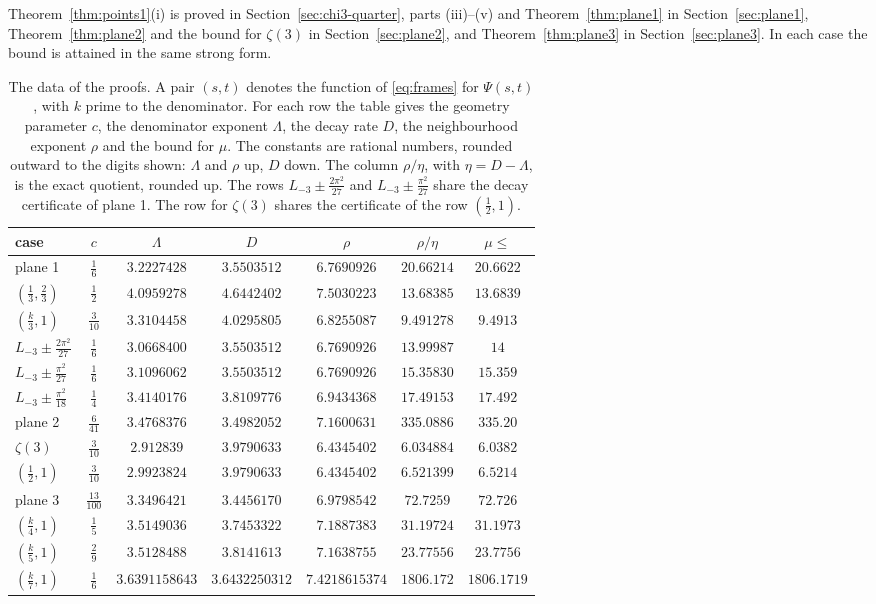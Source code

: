 \documentclass[11pt]{amsart}
\theoremstyle{definition}
\theoremstyle{remark}
\numberwithin{equation}{section}
\newcommand{\Lt}{L_{-3}}             %
\newcommand{\MuLamU}{31.1973}
\newcommand{\MuThirdsU}{9.4913}
\newcommand{\MuFifthsU}{23.7756}
\newcommand{\MuSeventhsU}{1806.1719}
\newcommand{\MuChi}{13.6839}
\newcommand{\MuHalvesU}{6.5214}
\newcommand{\MuPlaneA}{20.6622}
\newcommand{\MuPlaneB}{335.20}
\newcommand{\MuPlaneC}{72.726}
\newcommand{\MuZetaThree}{6.0382}
\newcommand{\MuDipA}{14}
\newcommand{\MuDipB}{15.359}
\newcommand{\MuDipC}{17.492}
\newcommand{\LamFour}{3.5149036}  \newcommand{\DFour}{3.7453322}  \newcommand{\gFour}{7.1887383}  \newcommand{\ExpFour}{31.19724}
\newcommand{\LamThree}{3.3104458} \newcommand{\DThree}{4.0295805} \newcommand{\gThree}{6.8255087} \newcommand{\ExpThree}{9.491278}
\newcommand{\LamFive}{3.5128488}  \newcommand{\DFive}{3.8141613}  \newcommand{\gFive}{7.1638755}  \newcommand{\ExpFive}{23.77556}
\newcommand{\LamSeven}{3.6391158643} \newcommand{\DSeven}{3.6432250312} \newcommand{\gSeven}{7.4218615374} \newcommand{\ExpSeven}{1806.172}
\newcommand{\LamHalf}{2.9923824}  \newcommand{\DHalf}{3.9790633}  \newcommand{\gHalf}{6.4345402}  \newcommand{\ExpHalf}{6.521399}
\newcommand{\LamChi}{4.0959278}   \newcommand{\DChi}{4.6442402}   \newcommand{\gChi}{7.5030223}  \newcommand{\ExpChi}{13.68385}
\newcommand{\LamPl}{3.2227428}    \newcommand{\DPl}{3.5503512}    \newcommand{\gPl}{6.7690926}   \newcommand{\ExpPl}{20.66214}
\newcommand{\LamDA}{3.0668400}    \newcommand{\ExpDA}{13.99987}
\newcommand{\LamDB}{3.1096062}    \newcommand{\ExpDB}{15.35830}
\newcommand{\LamDC}{3.4140176}    \newcommand{\DDC}{3.8109776}    \newcommand{\gDC}{6.9434368}   \newcommand{\ExpDC}{17.49153}
\newcommand{\LamPlB}{3.4768376}   \newcommand{\DPlB}{3.4982052}   \newcommand{\gPlB}{7.1600631}  \newcommand{\ExpPlB}{335.0886}
\newcommand{\LamPlC}{3.3496421}   \newcommand{\DPlC}{3.4456170}   \newcommand{\gPlC}{6.9798542}  \newcommand{\ExpPlC}{72.7259}
\newcommand{\LamZ}{2.912839}     \newcommand{\ExpZ}{6.034884}
\begin{document}
Theorem~\ref{thm:points1}(i) is proved in Section~\ref{sec:chi3-quarter}, parts (iii)--(v) and Theorem~\ref{thm:plane1}
in Section~\ref{sec:plane1}, Theorem~\ref{thm:plane2} and the bound for $\zeta(3)$ in Section~\ref{sec:plane2}, and
Theorem~\ref{thm:plane3} in Section~\ref{sec:plane3}. In each case the bound is attained in the same strong form.

\begin{table}[ht]
\centering
{\setlength{\tabcolsep}{1.5pt}
\begin{tabular}{@{}lcccccc@{}}
\toprule
case & $c$ & $\Lambda$ & $D$ & $\rho$ & $\rho/\eta$ & $\mu\le$\\
\midrule
plane 1 & $\frac16$ & $\LamPl$ & $\DPl$ & $\gPl$ & $\ExpPl$ & $\MuPlaneA$\\
$(\frac13,\frac23)$ & $\frac12$ & $\LamChi$ & $\DChi$ & $\gChi$ & $\ExpChi$ & $\MuChi$\\
$(\frac k3,1)$ & $\frac3{10}$ & $\LamThree$ & $\DThree$ & $\gThree$ & $\ExpThree$ & $\MuThirdsU$\\
$\Lt\pm\frac{2\pi^2}{27}$ & $\frac16$ & $\LamDA$ & $\DPl$ & $\gPl$ & $\ExpDA$ & $\MuDipA$\\
$\Lt\pm\frac{\pi^2}{27}$ & $\frac16$ & $\LamDB$ & $\DPl$ & $\gPl$ & $\ExpDB$ & $\MuDipB$\\
$\Lt\pm\frac{\pi^2}{18}$ & $\frac14$ & $\LamDC$ & $\DDC$ & $\gDC$ & $\ExpDC$ & $\MuDipC$\\
\addlinespace
plane 2 & $\frac6{41}$ & $\LamPlB$ & $\DPlB$ & $\gPlB$ & $\ExpPlB$ & $\MuPlaneB$\\
$\zeta(3)$ & $\frac3{10}$ & $\LamZ$ & $\DHalf$ & $\gHalf$ & $\ExpZ$ & $\MuZetaThree$\\
$(\frac12,1)$ & $\frac3{10}$ & $\LamHalf$ & $\DHalf$ & $\gHalf$ & $\ExpHalf$ & $\MuHalvesU$\\
\addlinespace
plane 3 & $\frac{13}{100}$ & $\LamPlC$ & $\DPlC$ & $\gPlC$ & $\ExpPlC$ & $\MuPlaneC$\\
\addlinespace
$(\frac k4,1)$ & $\frac15$ & $\LamFour$ & $\DFour$ & $\gFour$ & $\ExpFour$ & $\MuLamU$\\
$(\frac k5,1)$ & $\frac29$ & $\LamFive$ & $\DFive$ & $\gFive$ & $\ExpFive$ & $\MuFifthsU$\\
$(\frac k7,1)$ & $\frac16$ & $\LamSeven$ & $\DSeven$ & $\gSeven$ & $\ExpSeven$ & $\MuSeventhsU$\\
\bottomrule
\end{tabular}}
\caption{The data of the proofs. A pair $(s,t)$ denotes the function of \eqref{eq:frames} for $\Psi(s,t)$, with $k$
prime to the denominator. For each row the table gives the geometry parameter $c$, the denominator exponent $\Lambda$, the
decay rate $D$, the neighbourhood exponent $\rho$ and the bound for $\mu$. The constants are rational numbers, rounded outward to
the digits shown: $\Lambda$ and $\rho$ up, $D$ down. The column $\rho/\eta$, with $\eta=D-\Lambda$, is the exact quotient,
rounded up. The rows $\Lt\pm\frac{2\pi^2}{27}$ and $\Lt\pm\frac{\pi^2}{27}$ share the decay certificate of plane 1. The row for $\zeta(3)$ shares the
certificate of the row $(\frac12,1)$.}\label{tab:data}
\end{table}
\end{document}
